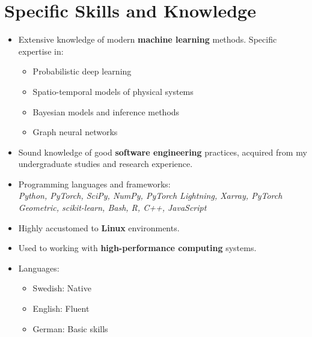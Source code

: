 \section*{Specific Skills and Knowledge}
\begin{itemize}
    \item Extensive knowledge of modern \textbf{machine learning} methods. Specific expertise in:
    \begin{itemize}
        \item Probabilistic deep learning
        \item Spatio-temporal models of physical systems
        \item Bayesian models and inference methods
        \item Graph neural networks
    \end{itemize}

    \item Sound knowledge of good \textbf{software engineering} practices, acquired from my undergraduate studies and research experience.

    \item Programming languages and frameworks:\\
    \textit{Python, PyTorch, SciPy, NumPy, PyTorch Lightning, Xarray, PyTorch Geometric, scikit-learn, Bash, R, C++, JavaScript}

    \item Highly accustomed to \textbf{Linux} environments.
    \item Used to working with \textbf{high-performance computing} systems.
    \item Languages:
    \begin{itemize}
        \item Swedish: Native
        \item English: Fluent
        \item German: Basic skills
    \end{itemize}
\end{itemize}


